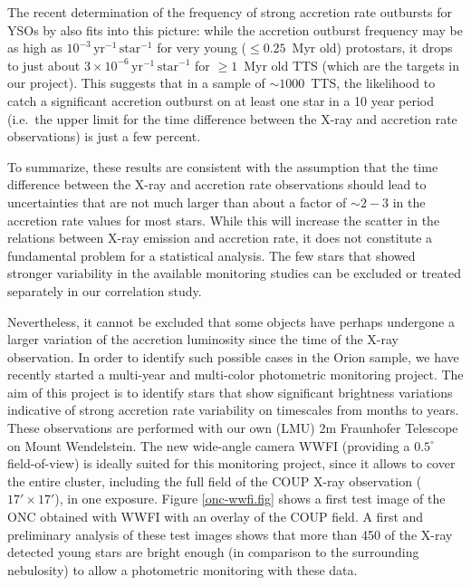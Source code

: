 \documentclass[10pt,fleqn,twoside]{article}
\begin{document}
The recent determination of the
frequency of strong accretion rate outbursts for YSOs by \citet{HF15}
also fits into this picture:
 while
the accretion outburst frequency may be as high as
 $10^{-3}\,\mathrm{yr}^{-1}\,\mathrm{star}^{-1}$ for very young
($\le 0.25$~Myr old) protostars, it drops to just about
$3 \times 10^{-6}\,\mathrm{yr}^{-1}\,\mathrm{star}^{-1}$ for
$\ge 1$~Myr old TTS (which are the targets in our project).
This suggests that 
in a sample of $\sim 1000$~TTS,
the likelihood to catch a significant accretion outburst
on at least one star in a 10 year period (i.e.~the upper limit for the
time difference between the X-ray and accretion rate observations)
is just a few percent.


To summarize, these
results are consistent with the assumption that the 
time difference between the
X-ray and accretion rate observations should lead to uncertainties
that are not much larger than about
a factor of $\sim 2-3$ in the accretion rate values for most stars.
While this will increase the scatter in the relations between
X-ray emission and accretion rate, it does not constitute a fundamental problem for
a statistical analysis.
%
The few stars that showed stronger variability in the available
monitoring studies can be excluded or treated separately
in our correlation study.

\medskip


Nevertheless, it cannot be excluded that some objects have
perhaps undergone a larger variation of the accretion luminosity
since the time of the X-ray observation.
In order to identify such possible cases in the Orion sample,
we have recently started a multi-year and multi-color
photometric monitoring project.
%
The aim of this project is to identify stars
that show significant brightness variations indicative of strong accretion rate variability
on timescales from months to years.
%
These observations are performed with our own (LMU) 2m Fraunhofer Telescope 
on Mount Wendelstein. 
The new wide-angle camera WWFI (providing a $0.5^\circ$ field-of-view) 
is ideally suited for this monitoring project, since it allows to cover
the entire cluster, including the full field of the COUP X-ray observation ($17' \times 17'$), in
one exposure. 
Figure \ref{onc-wwfi.fig} shows a first test image of the 
ONC obtained with WWFI with an overlay of the COUP field.
%
A first and preliminary  analysis of these test images shows that more than
450 of the X-ray detected young stars are bright enough (in comparison
to the surrounding nebulosity) to allow a photometric monitoring 
with these data.
\end{document}
